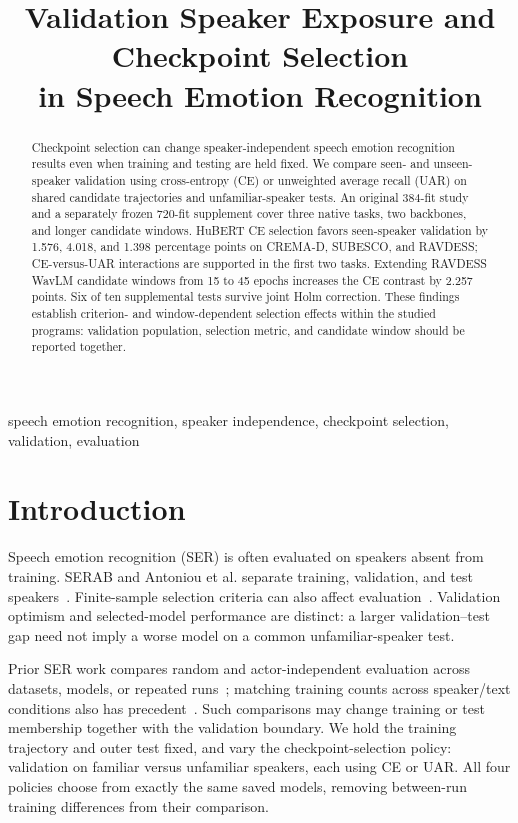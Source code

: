 \documentclass[letterpaper]{article}
\title{Validation Speaker Exposure and Checkpoint Selection\\in Speech Emotion Recognition}
\begin{document}
\maketitle
\begin{abstract}
Checkpoint selection can change speaker-independent speech emotion recognition results even when training and testing are held fixed. We compare seen- and unseen-speaker validation using cross-entropy (CE) or unweighted average recall (UAR) on shared candidate trajectories and unfamiliar-speaker tests. An original 384-fit study and a separately frozen 720-fit supplement cover three native tasks, two backbones, and longer candidate windows. HuBERT CE selection favors seen-speaker validation by 1.576, 4.018, and 1.398 percentage points on CREMA-D, SUBESCO, and RAVDESS; CE-versus-UAR interactions are supported in the first two tasks. Extending RAVDESS WavLM candidate windows from 15 to 45 epochs increases the CE contrast by 2.257 points. Six of ten supplemental tests survive joint Holm correction. These findings establish criterion- and window-dependent selection effects within the studied programs: validation population, selection metric, and candidate window should be reported together.
\end{abstract}
\begin{keywords}
speech emotion recognition, speaker independence, checkpoint selection, validation, evaluation
\end{keywords}

\section{Introduction}
Speech emotion recognition (SER) is often evaluated on speakers absent from training. SERAB and Antoniou et al. separate training, validation, and test speakers~\cite{serab,antoniou}. Finite-sample selection criteria can also affect evaluation~\cite{cawley}. Validation optimism and selected-model performance are distinct: a larger validation--test gap need not imply a worse model on a common unfamiliar-speaker test.

Prior SER work compares random and actor-independent evaluation across datasets, models, or repeated runs~\cite{ibrahim,zielonka,kumari}; matching training counts across speaker/text conditions also has precedent~\cite{atmaja}. Such comparisons may change training or test membership together with the validation boundary. We hold the training trajectory and outer test fixed, and vary the checkpoint-selection policy: validation on familiar versus unfamiliar speakers, each using CE or UAR. All four policies choose from exactly the same saved models, removing between-run training differences from their comparison.
\end{document}
